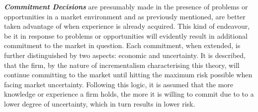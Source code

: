 \documentclass[11pt,a4paper]{article}
\begin{document}
\textbf{\textit{Commitment Decisions}} are presumably made in the presence of problems or opportunities in a market environment and as previously mentioned, are better taken advantage of when experience is already acquired. This kind of endeavour, be it in response to problems or opportunities will evidently result in additional commitment to the market in question. Each commitment, when extended, is further distinguished by two aspects: economic and uncertainty. It is described, that the firm, by the nature of incrementalism characterising this theory, will continue committing to the market until hitting the maximum risk possible when facing market uncertainty. Following this logic, it is assumed that the more knowledge or experience a firm holds, the more it is willing to commit due to to a lower degree of uncertainty, which in turn results in lower risk. \par
\end{document}
